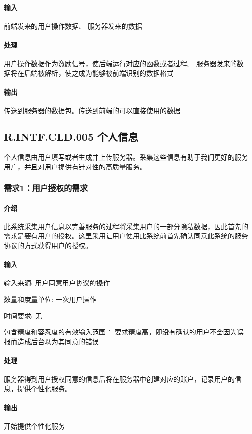 \paragraph{输入}

前端发来的用户操作数据、
服务器发来的数据

\paragraph{处理}

用户操作数据作为激励信号，使后端运行对应的函数或者过程。
服务器发来的数据将在后端被解析，使之成为能够被前端识别的数据格式

\paragraph{输出}

传送到服务器的数据包。传送到前端的可以直接使用的数据

\subsection{R.INTF.CLD.005 个人信息}
个人信息由用户填写或者生成并上传服务器。采集这些信息有助于我们更好的服务用户，并且对用户提供有针对性的高质量服务。
\subsubsection{需求1：用户授权的需求}
\paragraph{介绍}
此系统采集用户信息以完善服务的过程将采集用户的一部分隐私数据，因此首先的需求是要有用户的授权。这里采用让用户使用此系统前首先确认同意此系统的服务协议的方式获得用户的授权。
\paragraph{输入}
输入来源:
用户同意用户协议的操作

数量和度量单位:
一次用户操作

时间要求:
无

包含精度和容忍度的有效输入范围：
要求精度高，即没有确认的用户不会因为误报而造成后台以为其同意的错误
\paragraph{处理}
服务器得到用户授权同意的信息后将在服务器中创建对应的账户，记录用户的信息，提供个性化服务。
\paragraph{输出}
开始提供个性化服务

